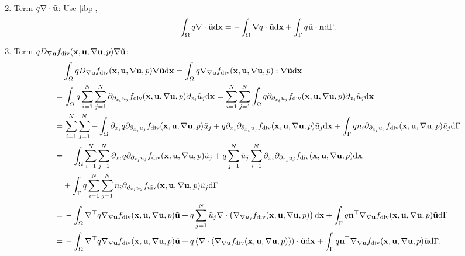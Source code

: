 \documentclass[oneside]{book}
\numberwithin{equation}{section}
\begin{document}
\begin{enumerate}[leftmargin=0in]
\begin{align*}
    \end{align*}
    \item Term $q\nabla\cdot\tilde{\bf u}$: Use \eqref{ibp},
    \begin{align*}
        \int_\Omega q\nabla\cdot\tilde{\bf u}{\rm d}{\bf x} = -\int_\Omega \nabla q\cdot\tilde{\bf u}{\rm d}{\bf x} + \int_\Gamma q\tilde{\bf u}\cdot{\bf n}{\rm d}\Gamma.
    \end{align*}
    \item Term $qD_{\nabla{\bf u}}f_{\rm div}({\bf x},{\bf u},\nabla{\bf u},p)\nabla\tilde{\bf u}$:
    \begin{align*}
        &\int_\Omega qD_{\nabla{\bf u}}f_{\rm div}({\bf x},{\bf u},\nabla{\bf u},p)\nabla\tilde{\bf u}{\rm d}{\bf x} = \int_\Omega q\nabla_{\nabla{\bf u}}f_{\rm div}({\bf x},{\bf u},\nabla{\bf u},p):\nabla\tilde{\bf u}{\rm d}{\bf x}\\
        =&\, \int_\Omega q\sum_{i=1}^N\sum_{j=1}^N \partial_{\partial_{x_i}u_j}f_{\rm div}({\bf x},{\bf u},\nabla{\bf u},p)\partial_{x_i}\tilde{u}_j{\rm d}{\bf x} = \sum_{i=1}^N\sum_{j=1}^N \int_\Omega q\partial_{\partial_{x_i}u_j}f_{\rm div}({\bf x},{\bf u},\nabla{\bf u},p)\partial_{x_i}\tilde{u}_j{\rm d}{\bf x}\\
        =&\, \sum_{i=1}^N\sum_{j=1}^N -\int_\Omega \partial_{x_i}q\partial_{\partial_{x_i}u_j}f_{\rm div}({\bf x},{\bf u},\nabla{\bf u},p)\tilde{u}_j + q\partial_{x_i}\partial_{\partial_{x_i}u_j}f_{\rm div}({\bf x},{\bf u},\nabla{\bf u},p)\tilde{u}_j{\rm d}{\bf x} + \int_\Gamma qn_i\partial_{\partial_{x_i}u_j}f_{\rm div}({\bf x},{\bf u},\nabla{\bf u},p)\tilde{u}_j{\rm d}\Gamma\\
        =&\, -\int_\Omega \sum_{i=1}^N\sum_{j=1}^N \partial_{x_i}q\partial_{\partial_{x_i}u_j}f_{\rm div}({\bf x},{\bf u},\nabla{\bf u},p)\tilde{u}_j + q\sum_{j=1}^N \tilde{u}_j\sum_{i=1}^N \partial_{x_i}\partial_{\partial_{x_i}u_j}f_{\rm div}({\bf x},{\bf u},\nabla{\bf u},p){\rm d}{\bf x}\\
        &+ \int_\Gamma q\sum_{i=1}^N\sum_{j=1}^N n_i\partial_{\partial_{x_i}u_j}f_{\rm div}({\bf x},{\bf u},\nabla{\bf u},p)\tilde{u}_j{\rm d}\Gamma\\
        =&\, -\int_\Omega \nabla^\top q\nabla_{\nabla{\bf u}}f_{\rm div}({\bf x},{\bf u},\nabla{\bf u},p)\tilde{\bf u} + q\sum_{j=1}^N \tilde{u}_j\nabla\cdot\left(\nabla_{\nabla u_j}f_{\rm div}({\bf x},{\bf u},\nabla{\bf u},p)\right){\rm d}{\bf x} + \int_\Gamma q{\bf n}^\top\nabla_{\nabla{\bf u}}f_{\rm div}({\bf x},{\bf u},\nabla{\bf u},p)\tilde{\bf u}{\rm d}\Gamma\\
        =&\, -\int_\Omega \nabla^\top q\nabla_{\nabla{\bf u}}f_{\rm div}({\bf x},{\bf u},\nabla{\bf u},p)\tilde{\bf u} + q\left(\nabla\cdot\left(\nabla_{\nabla{\bf u}}f_{\rm div}({\bf x},{\bf u},\nabla{\bf u},p)\right)\right)\cdot\tilde{\bf u}{\rm d}{\bf x} + \int_\Gamma q{\bf n}^\top\nabla_{\nabla{\bf u}}f_{\rm div}({\bf x},{\bf u},\nabla{\bf u},p)\tilde{\bf u}{\rm d}\Gamma.
    \end{align*}
\end{enumerate}
\end{document}

